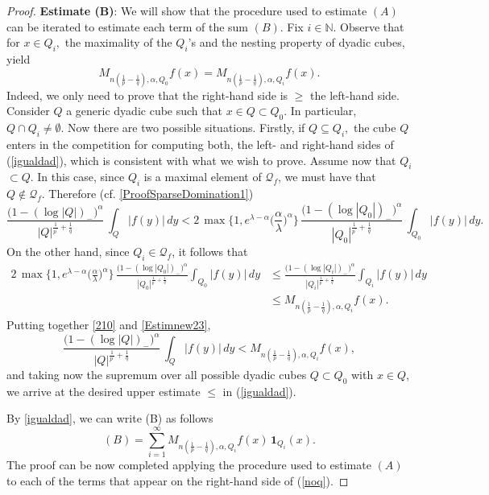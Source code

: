 \documentclass[11pt, a4paper,leqno]{amsart}
\theoremstyle{plain}
\numberwithin{equation}{section}
\theoremstyle{definition}
\theoremstyle{remark}
\begin{document}
\begin{proof}
\vspace{2mm} \textbf{Estimate (B)}: We will show that the procedure used to
estimate $(A)$ can be iterated to estimate each term of the sum $(B)$. Fix
$i\in\mathbb{N}$. Observe that\textbf{ }for $x\in Q_{i},$ the maximality of
the $Q_{i}$'s and the nesting property of dyadic cubes, yield
\begin{equation}
M_{n(\frac{1}{p}-\frac{1}{q}),\alpha,Q_{0}}f(x)=M_{n(\frac{1}{p}-\frac{1}%
{q}),\alpha,Q_{i}}f(x). \label{igualdad}%
\end{equation}
Indeed, we only need to prove that the right-hand side is $\geq$ the
left-hand side. Consider $Q$ a generic dyadic cube such that $x\in Q\subset
Q_{0}.$ In particular, $Q\cap Q_{i}\neq\emptyset$. Now there are two possible
situations. Firstly, if $Q\subseteq Q_{i},$ the cube $Q$ enters in the
competition for computing both, the left- and right-hand sides of
(\ref{igualdad}), which is consistent with what we wish to prove. Assume now
that $Q_{i}$ $\subset Q.$ In this case, since $Q_{i}$ is a maximal element of
$\mathcal{Q}_{f}$, we must have that $Q\notin\mathcal{Q}_{f}.$ Therefore (cf.
\eqref{ProofSparseDomination1})
\begin{equation}
\frac{\big(1-(\log|Q|)_{-}\big)^{\alpha}}{|Q|^{\frac{1}{p^{\prime}}+\frac
{1}{q}}}\,\int_{Q}|f(y)|\,dy<2\,\max\bigg\{1,e^{\lambda-\alpha}\bigg(\frac
{\alpha}{\lambda}\bigg)^{\alpha}\bigg\}\,\frac{\big(1-(\log|Q_{0}%
|)_{-}\big)^{\alpha}}{|Q_{0}|^{\frac{1}{p^{\prime}}+\frac{1}{q}}}\,\int%
_{Q_{0}}|f(y)|\,dy. \label{210}%
\end{equation}
On the other hand, since $Q_{i}\in\mathcal{Q}_{f}$, it follows that%
\begin{align}
2\,\max\bigg\{1,e^{\lambda-\alpha}\bigg(\frac{\alpha}{\lambda}\bigg)^{\alpha
}\bigg\}\,\frac{\big(1-(\log|Q_{0}|)_{-}\big)^{\alpha}}{|Q_{0}|^{\frac
{1}{p^{\prime}}+\frac{1}{q}}}\int_{Q_{0}}|f(y)|\,dy  &  \leq\frac
{\big(1-(\log|Q_{i}|)_{-}\big)^{\alpha}}{|Q_{i}|^{\frac{1}{p^{\prime}}%
+\frac{1}{q}}}\int_{Q_{i}}|f(y)|\,dy\nonumber\\
&  \leq M_{n(\frac{1}{p}-\frac{1}{q}),\alpha,Q_{i}}f(x). \label{Estimnew23}%
\end{align}
Putting together \eqref{210} and \eqref{Estimnew23},
\[
\frac{\big(1-(\log|Q|)_{-}\big)^{\alpha}}{|Q|^{\frac{1}{p^{\prime}}+\frac
{1}{q}}}\,\int_{Q}|f(y)|\,dy<M_{n(\frac{1}{p}-\frac{1}{q}),\alpha,Q_{i}}f(x),
\]
and taking now the supremum over all possible dyadic cubes $Q\subset Q_{0}$
with $x\in Q$, we arrive at the desired upper estimate $\leq$ in
(\ref{igualdad}).

By \eqref{igualdad}, we can write (B) as follows%
\begin{equation}
(B) = \sum_{i=1}^{\infty}M_{n(\frac{1}{p}-\frac{1}{q}),\alpha,Q_{i}%
}f(x)\,\mathbf{1}_{Q_{i}}(x). \label{noq}%
\end{equation}
The proof can be now completed applying the procedure used to estimate $(A)$
to each of the terms that appear on the right-hand side of (\ref{noq}).
\end{proof}
\end{document}
